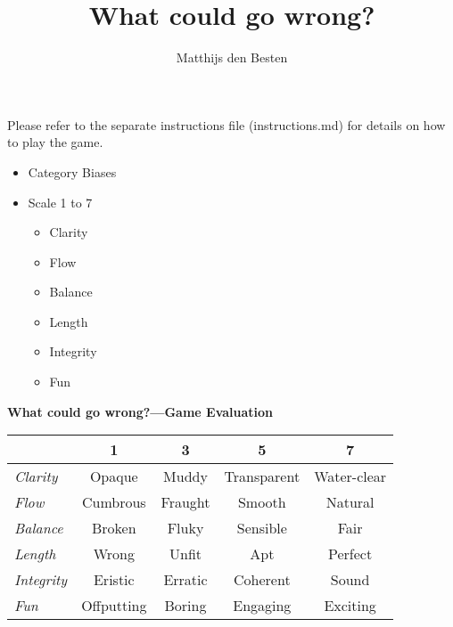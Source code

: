 \documentclass[grid,avery5371]{flashcards}
\title{What could go wrong?}
\author{Matthijs den Besten}
\begin{document}

\begin{flashcard}{
  Please refer to the separate instructions file (instructions.md) for details on how to play the game.
}

\begin{flashcard}{
    \begin{itemize}\tiny \setlength{\itemsep}{.1ex}
        \item Category Biases
        \item Scale 1 to 7
        \begin{multicols}{3}
        \begin{itemize}
            \item Clarity
            \item Flow
            \item Balance
            \item Length
            \item Integrity
            \item Fun
        \end{itemize}
        \end{multicols}
    \end{itemize}
    }
    {\bf\small What could go wrong?---Game Evaluation}
    \small
    \begin{tabular}{l|c|c|c|c|}
        & 1 & 3 & 5 & 7\\
    \hline
    {\em Clarity} & Opaque & Muddy & Transparent & Water-clear \\
    {\em Flow} & Cumbrous & Fraught & Smooth & Natural \\
    {\em Balance} & Broken & Fluky & Sensible & Fair\\
    {\em Length} & Wrong & Unfit & Apt & Perfect \\
    {\em Integrity} & Eristic & Erratic & Coherent & Sound \\
    {\em Fun} & Offputting & Boring & Engaging & Exciting \\
    \hline
    \end{tabular}
\end{flashcard}


\end{flashcard}
\end{document}
